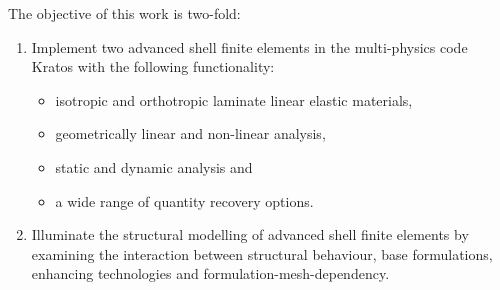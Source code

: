 The objective of this work is two-fold:
\begin{enumerate}
	\item Implement two advanced shell finite elements in the multi-physics code Kratos \cite{dadvand2010object} with the following functionality:
	\begin{itemize}
		\item isotropic and orthotropic laminate linear elastic materials,
		\item geometrically linear and non-linear analysis,
		\item static and dynamic analysis and
		\item a wide range of quantity recovery options.\\
	\end{itemize}

	\item Illuminate the structural modelling of advanced shell finite elements by examining the interaction between structural behaviour, base formulations, enhancing technologies and formulation-mesh-dependency.
\end{enumerate}


